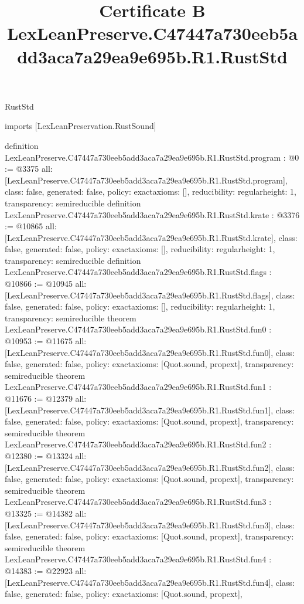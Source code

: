 \begin{lexlean}{RustStd}
\title{Certificate B LexLeanPreserve.C47447a730eeb5add3aca7a29ea9e695b.R1.RustStd}
\begin{coremodule}
imports [LexLeanPreservation.RustSound]

definition LexLeanPreserve.C47447a730eeb5add3aca7a29ea9e695b.R1.RustStd.program : @0 := @3375 {
  all: [LexLeanPreserve.C47447a730eeb5add3aca7a29ea9e695b.R1.RustStd.program],
  class: false,
  generated: false,
  policy: exact{axioms: []},
  reducibility: regular{height: 1},
  transparency: semireducible
}
definition LexLeanPreserve.C47447a730eeb5add3aca7a29ea9e695b.R1.RustStd.krate : @3376 := @10865 {
  all: [LexLeanPreserve.C47447a730eeb5add3aca7a29ea9e695b.R1.RustStd.krate],
  class: false,
  generated: false,
  policy: exact{axioms: []},
  reducibility: regular{height: 1},
  transparency: semireducible
}
definition LexLeanPreserve.C47447a730eeb5add3aca7a29ea9e695b.R1.RustStd.flags : @10866 := @10945 {
  all: [LexLeanPreserve.C47447a730eeb5add3aca7a29ea9e695b.R1.RustStd.flags],
  class: false,
  generated: false,
  policy: exact{axioms: []},
  reducibility: regular{height: 1},
  transparency: semireducible
}
theorem LexLeanPreserve.C47447a730eeb5add3aca7a29ea9e695b.R1.RustStd.fun0 : @10953 := @11675 {
  all: [LexLeanPreserve.C47447a730eeb5add3aca7a29ea9e695b.R1.RustStd.fun0],
  class: false,
  generated: false,
  policy: exact{axioms: [Quot.sound, propext]},
  transparency: semireducible
}
theorem LexLeanPreserve.C47447a730eeb5add3aca7a29ea9e695b.R1.RustStd.fun1 : @11676 := @12379 {
  all: [LexLeanPreserve.C47447a730eeb5add3aca7a29ea9e695b.R1.RustStd.fun1],
  class: false,
  generated: false,
  policy: exact{axioms: [Quot.sound, propext]},
  transparency: semireducible
}
theorem LexLeanPreserve.C47447a730eeb5add3aca7a29ea9e695b.R1.RustStd.fun2 : @12380 := @13324 {
  all: [LexLeanPreserve.C47447a730eeb5add3aca7a29ea9e695b.R1.RustStd.fun2],
  class: false,
  generated: false,
  policy: exact{axioms: [Quot.sound, propext]},
  transparency: semireducible
}
theorem LexLeanPreserve.C47447a730eeb5add3aca7a29ea9e695b.R1.RustStd.fun3 : @13325 := @14382 {
  all: [LexLeanPreserve.C47447a730eeb5add3aca7a29ea9e695b.R1.RustStd.fun3],
  class: false,
  generated: false,
  policy: exact{axioms: [Quot.sound, propext]},
  transparency: semireducible
}
theorem LexLeanPreserve.C47447a730eeb5add3aca7a29ea9e695b.R1.RustStd.fun4 : @14383 := @22923 {
  all: [LexLeanPreserve.C47447a730eeb5add3aca7a29ea9e695b.R1.RustStd.fun4],
  class: false,
  generated: false,
  policy: exact{axioms: [Quot.sound, propext]},
}
\end{coremodule}
\end{lexlean}
